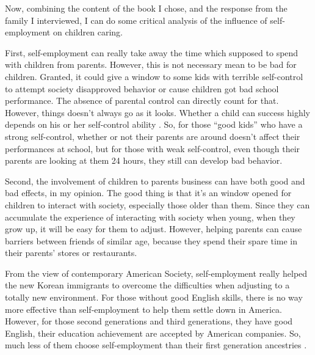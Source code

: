 Now, combining the content of the book I chose, and the response from the family
I interviewed, I can do some critical analysis of the influence of
self-employment on children caring.
\par
First, self-employment can really take away the time which supposed to spend
with children from parents. However, this is not necessary mean to be bad for
children. Granted, it could give a window to some kids with terrible
self-control to attempt society disapproved behavior or cause children got bad
school performance. The absence of parental control can directly count for that.
However, things doesn't always go as it looks. Whether a child can success
highly depends on his or her self-control ability \cite{article:SelfControl}.
So, for those ``good kids'' who have a strong self-control, whether or not their
parents are around doesn't affect their performances at school, but for those
with weak self-control, even though their parents are looking at them 24 hours,
they still can develop bad behavior.
\par
Second, the involvement of children to parents business can have both good and
bad effects, in my opinion. The good thing is that it's an window opened for
children to interact with society, especially those older than them. Since they
can accumulate the experience of interacting with society when young, when they
grow up, it will be easy for them to adjust. However, helping parents can cause
barriers between friends of similar age, because they spend their spare time in
their parents' stores or restaurants. 
\par
From the view of contemporary American Society, self-employment really helped
the new Korean immigrants to overcome the difficulties when adjusting to a
totally new environment. For those without good English skills, there is no way
more effective than self-employment to help them settle down in America.
However, for those second generations and third generations, they have good
English, their education achievement are accepted by American companies. So,
much less of them choose self-employment than their first generation ancestries
\cite{online:SecondGenerationSelfEmployment}.
